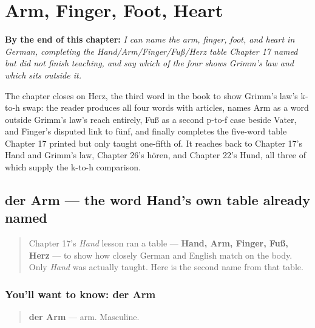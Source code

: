 
\chapter{Arm, Finger, Foot, Heart}
\label{ch:ge-hand-table-complete}

\begin{chapteropening}
\textbf{By the end of this chapter:} \emph{I can name the arm, finger, foot, and heart in German, completing the Hand/Arm/Finger/Fuß/Herz table Chapter 17 named but did not finish teaching, and say which of the four shows Grimm's law and which sits outside it.}

The chapter closes on Herz, the third word in the book to show Grimm's law's k-to-h swap: the reader produces all four words with articles, names Arm as a word outside Grimm's law's reach entirely, Fuß as a second p-to-f case beside Vater, and Finger's disputed link to fünf, and finally completes the five-word table Chapter 17 printed but only taught one-fifth of. It reaches back to Chapter 17's Hand and Grimm's law, Chapter 26's hören, and Chapter 22's Hund, all three of which supply the k-to-h comparison.
\end{chapteropening}

\section[der Arm]{der Arm — the word Hand's own table already named}

\label{lesson:GE-C31-arm}



\begin{quote}
Chapter 17's \emph{Hand} lesson ran a table — \textbf{Hand, Arm, Finger, Fuß, Herz} — to show how closely German and English match on the body. Only \emph{Hand} was actually taught. Here is the second name from that table.
\end{quote}

\subsection*{You'll want to know: der Arm}
\begin{quote}
\textbf{der Arm} — arm. Masculine.
\end{quote}

